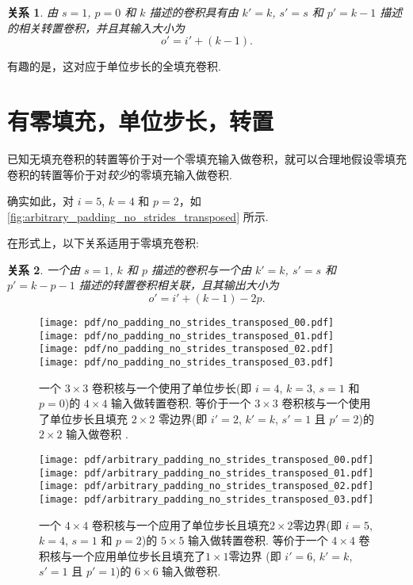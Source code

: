 \documentclass[notitlepage]{ctexrep}
\newtheorem{relationship}{关系}
\begin{document}
\begin{relationship}\label{rel:no_padding_no_strides_transposed}
由 $s = 1$, $p = 0$ 和 $k$ 描述的卷积具有由 $k' = k$, $s' = s$ 和 $p' = k - 1$ 描述的相关转置卷积，并且其输入大小为 
\begin{equation*}
    o' = i' + (k - 1).
\end{equation*}
\end{relationship}

有趣的是，这对应于单位步长的全填充卷积.

\section{有零填充，单位步长，转置}

已知无填充卷积的转置等价于对一个零填充输入做卷积，就可以合理地假设零填充卷积的转置等价于对{\em 较少}的零填充输入做卷积.

确实如此，对 $i = 5$, $k = 4$ 和 $p = 2$，如 \autoref{fig:arbitrary_padding_no_strides_transposed} 所示.

在形式上，以下关系适用于零填充卷积:

\begin{relationship}\label{rel:arbitrary_padding_no_strides_transposed}
一个由 $s = 1$, $k$ 和 $p$ 描述的卷积与一个由 $k' = k$, $s' = s$ 和 $p' = k -
p - 1$ 描述的转置卷积相关联，且其输出大小为
\begin{equation*}
    o' = i' + (k - 1) - 2p.
\end{equation*}
\end{relationship}

\begin{figure}[p]
    \centering
    \texttt{[image: pdf/no\_padding\_no\_strides\_transposed\_00.pdf]}
    \texttt{[image: pdf/no\_padding\_no\_strides\_transposed\_01.pdf]}
    \texttt{[image: pdf/no\_padding\_no\_strides\_transposed\_02.pdf]}
    \texttt{[image: pdf/no\_padding\_no\_strides\_transposed\_03.pdf]}
    \caption{\label{fig:no_padding_no_strides_transposed} 
    一个 $3 \times 3$ 卷积核与一个使用了单位步长(即 $i = 4$, $k = 3$, $s = 1$ 和 $p = 0$)的 $4 \times 4$ 输入做转置卷积. 等价于一个 $3 \times 3$ 卷积核与一个使用了单位步长且填充 $2 \times 2$ 零边界(即 $i' = 2$, $k' = k$, $s' = 1$ 且 $p' = 2$)的 $2 \times 2$ 输入做卷积 .}
\end{figure}

\begin{figure}[p]
    \centering
    \texttt{[image: pdf/arbitrary\_padding\_no\_strides\_transposed\_00.pdf]}
    \texttt{[image: pdf/arbitrary\_padding\_no\_strides\_transposed\_01.pdf]}
    \texttt{[image: pdf/arbitrary\_padding\_no\_strides\_transposed\_02.pdf]}
    \texttt{[image: pdf/arbitrary\_padding\_no\_strides\_transposed\_03.pdf]}
    \caption{\label{fig:arbitrary_padding_no_strides_transposed} 
    一个 $4 \times 4$ 卷积核与一个应用了单位步长且填充$2 \times 2$零边界(即 $i = 5$, $k = 4$, $s = 1$ 和 $p = 2$)的 $5 \times 5$ 输入做转置卷积. 等价于一个 $4 \times 4$ 卷积核与一个应用单位步长且填充了$1 \times 1$零边界 (即 $i' = 6$, $k' = k$, $s' = 1$ 且 $p' = 1$)的 $6 \times 6$ 输入做卷积.}
\end{figure}
\end{document}
